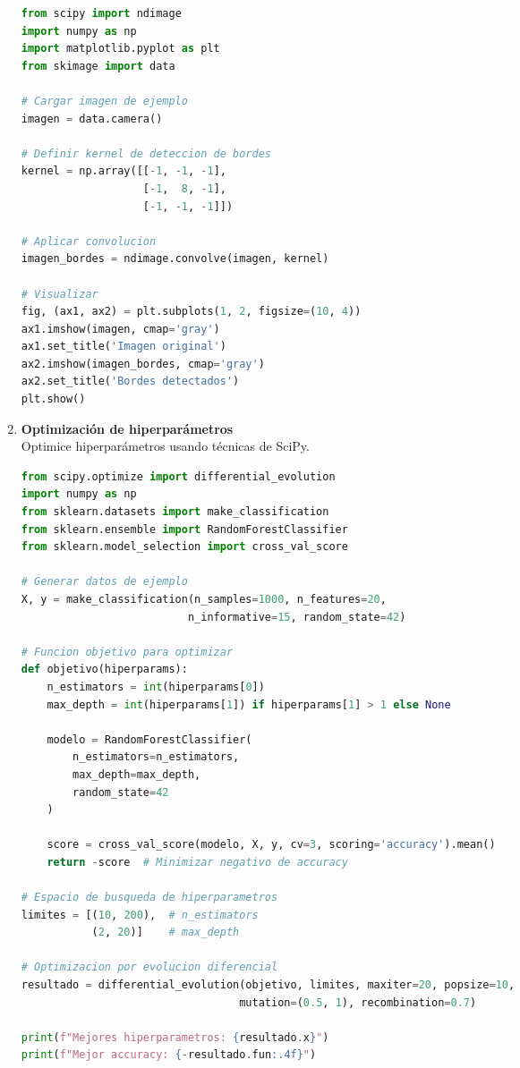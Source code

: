 \documentclass[12pt,a4paper]{article}
\begin{document}
\begin{enumerate}[label=\textbf{Ejercicio \arabic*:}, leftmargin=1.5cm]
\begin{lstlisting}[language=Python]
from scipy import ndimage
import numpy as np
import matplotlib.pyplot as plt
from skimage import data

# Cargar imagen de ejemplo
imagen = data.camera()

# Definir kernel de deteccion de bordes
kernel = np.array([[-1, -1, -1],
                   [-1,  8, -1],
                   [-1, -1, -1]])

# Aplicar convolucion
imagen_bordes = ndimage.convolve(imagen, kernel)

# Visualizar
fig, (ax1, ax2) = plt.subplots(1, 2, figsize=(10, 4))
ax1.imshow(imagen, cmap='gray')
ax1.set_title('Imagen original')
ax2.imshow(imagen_bordes, cmap='gray')
ax2.set_title('Bordes detectados')
plt.show()
\end{lstlisting}

\item \textbf{Optimización de hiperparámetros} \\
Optimice hiperparámetros usando técnicas de SciPy.

\begin{lstlisting}[language=Python]
from scipy.optimize import differential_evolution
import numpy as np
from sklearn.datasets import make_classification
from sklearn.ensemble import RandomForestClassifier
from sklearn.model_selection import cross_val_score

# Generar datos de ejemplo
X, y = make_classification(n_samples=1000, n_features=20, 
                          n_informative=15, random_state=42)

# Funcion objetivo para optimizar
def objetivo(hiperparams):
    n_estimators = int(hiperparams[0])
    max_depth = int(hiperparams[1]) if hiperparams[1] > 1 else None
    
    modelo = RandomForestClassifier(
        n_estimators=n_estimators,
        max_depth=max_depth,
        random_state=42
    )
    
    score = cross_val_score(modelo, X, y, cv=3, scoring='accuracy').mean()
    return -score  # Minimizar negativo de accuracy

# Espacio de busqueda de hiperparametros
limites = [(10, 200),  # n_estimators
           (2, 20)]    # max_depth

# Optimizacion por evolucion diferencial
resultado = differential_evolution(objetivo, limites, maxiter=20, popsize=10,
                                  mutation=(0.5, 1), recombination=0.7)

print(f"Mejores hiperparametros: {resultado.x}")
print(f"Mejor accuracy: {-resultado.fun:.4f}")
\end{lstlisting}

\end{enumerate}
\end{document}
